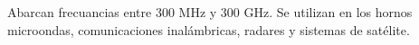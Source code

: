 Abarcan frecuancias entre 300 MHz y 300 GHz. Se utilizan en los hornos microondas, comunicaciones inalámbricas, radares y sistemas de satélite.
